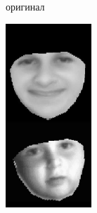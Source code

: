 \begin{figure}[t]
\begin{subfigure}[t]{0.2\textwidth}
		\caption{оригинал}
	\end{subfigure}
	\begin{subfigure}[t]{0.2\textwidth}
		\includegraphics[width=\textwidth]{gandhi/lanitis2.png}

\end{subfigure}
\end{figure}
